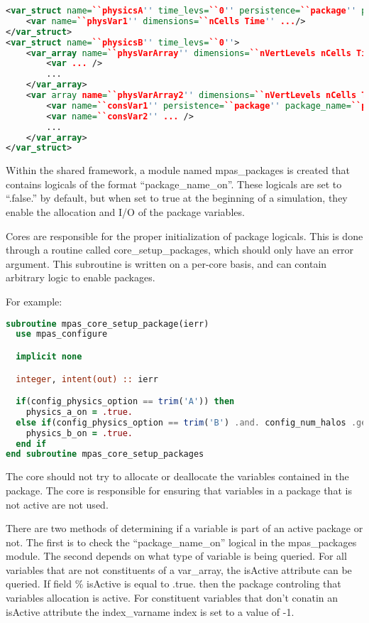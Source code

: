 \documentclass[11pt]{report}
\begin{document}
{\scriptsize
\begin{lstlisting}[language=XML]
<var_struct name=``physicsA'' time_levs=``0'' persistence=``package'' package_name=``package_a''>
	<var name=``physVar1'' dimensions=``nCells Time'' .../>
</var_struct>
<var_struct name=``physicsB'' time_levs=``0''>
	<var_array name=``physVarArray'' dimensions=``nVertLevels nCells Time'' persistence=``package'' package_name=``package_b''>
		<var ... />
		...
	</var_array>
	<var array name=``physVarArray2'' dimensions=``nVertLevels nCells Time''>
		<var name=``consVar1'' persistence=``package'' package_name=``package_b'' ... />
		<var name=``consVar2'' ... />
		...
	</var_array>
</var_struct>
\end{lstlisting}
}

Within the shared framework, a module named mpas\_packages is created that
contains logicals of the format ``package\_name\_on''. These logicals are set
to ``.false.'' by default, but when set to true at the beginning of a
simulation, they enable the allocation and I/O of the package variables. 

Cores are responsible for the proper initialization of package logicals. This
is done through a routine called core\_setup\_packages, which should only have
an error argument. This subroutine is written on a per-core basis, and can
contain arbitrary logic to enable packages.

For example:
{\scriptsize
\begin{lstlisting}[language=Fortran]
subroutine mpas_core_setup_package(ierr)
  use mpas_configure

  implicit none

  integer, intent(out) :: ierr

  if(config_physics_option == trim('A')) then
    physics_a_on = .true.
  else if(config_physics_option == trim('B') .and. config_num_halos .ge. 3) then
    physics_b_on = .true.
  end if
end subroutine mpas_core_setup_packages
\end{lstlisting}
}

The core should not try to allocate or deallocate the variables contained in
the package. The core is responsible for ensuring that variables in a package
that is not active are not used.

There are two methods of determining if a variable is part of an active package
or not. The first is to check the ``package\_name\_on'' logical in the
mpas\_packages module. The second depends on what type of variable is being
queried. For all variables that are not constituents of a var\_array, the
isActive attribute can be queried. If field \% isActive is equal to .true. then
the package controling that variables allocation is active. For constituent
variables that don't conatin an isActive attribute the index\_varname index is
set to a value of -1. 
\end{document}
